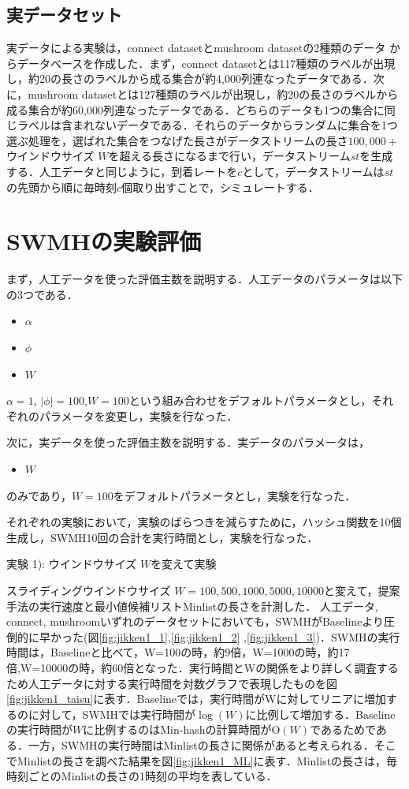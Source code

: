 \subsection{実データセット}
実データによる実験は，connect datasetとmushroom datasetの2種類のデータ \cite{Maxloghash} \cite{dataset2} からデータベースを作成した．まず，connect datasetとは117種類のラベルが出現し，約20の長さのラベルから成る集合が約4,000列連なったデータである．次に，mushroom datasetとは127種類のラベルが出現し，約20の長さのラベルから成る集合が約60,000列連なったデータである．どちらのデータも1つの集合に同じラベルは含まれないデータである．それらのデータからランダムに集合を1つ選ぶ処理を，選ばれた集合をつなげた長さがデータストリームの長さ$100,000 + $ウインドウサイズ $W$を超える長さになるまで行い，データストリーム$st$を生成する．人工データと同じように，到着レートを$c$として，データストリームは$st$の先頭から順に毎時刻$c$個取り出すことで，シミュレートする．

\section{SWMHの実験評価}
まず，人工データを使った評価主数を説明する．人工データのパラメータは以下の3つである．
\begin{itemize}
\item $\alpha$
\item $\phi$
\item $W$

\end{itemize}

$\alpha = 1$, $|\phi|=100$,$W = 100$という組み合わせをデフォルトパラメータとし，それぞれのパラメータを変更し，実験を行なった．

次に，実データを使った評価主数を説明する．実データのパラメータは，

\begin{itemize}
\item $W$
\end{itemize}

のみであり，$W = 100$をデフォルトパラメータとし，実験を行なった．

それぞれの実験において，実験のばらつきを減らすために，ハッシュ関数を10個生成し，SWMH10回の合計を実行時間とし，実験を行なった．


実験	1): ウインドウサイズ $W$を変えて実験

スライディングウインドウサイズ $W = 100, 500, 1000, 5000, 10000$と変えて，提案手法の実行速度と最小値候補リストMinlistの長さを計測した．
人工データ, connect, mushroomいずれのデータセットにおいても，SWMHがBaselineより圧倒的に早かった(図\ref{fig:jikken1_1},\ref{fig:jikken1_2} ,\ref{fig:jikken1_3})．SWMHの実行時間は，Baselineと比べて，W=100の時，約9倍，W=1000の時，約17倍,W=10000の時，約60倍となった．実行時間とWの関係をより詳しく調査するため人工データに対する実行時間を対数グラフで表現したものを図\ref{fig:jikken1_taisu}に表す．Baselineでは，実行時間がWに対してリニアに増加するのに対して，SWMHでは実行時間が$\log (W)$に比例して増加する．Baselineの実行時間が$W$に比例するのはMin-hashの計算時間がO$(W)$であるためである．一方，SWMHの実行時間はMinlistの長さに関係があると考えられる．そこでMinlistの長さを調べた結果を図\ref{fig:jikken1_ML}に表す．Minlistの長さは，毎時刻ごとのMinlistの長さの1時刻の平均を表している．

